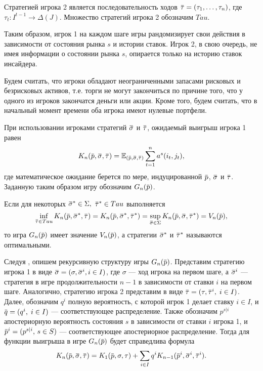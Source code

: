 {\begin{definition}
  Стратегией игрока 2 является последовательность ходов $\tauv = (\tau_1,
  \ldots, \tau_n)$, где $\tau_t: I^{t-1} \rightarrow \Delta(J)$. Множество
  стратегий игрока 2 обозначим $Tau$.
\end{definition}

Таким образом, игрок 1 на каждом шаге игры рандомизирует свои действия в
зависимости от состояния рынка $s$ и истории ставок. Игрок 2, в свою очередь, не
имея информации о состоянии рынка $s$, опирается только на историю ставок
инсайдера.

Будем считать, что игроки обладают неограниченными запасами рисковых и
безрисковых активов, т.е. торги не могут закончиться по причине того, что у
одного из игроков закончатся деньги или акции. Кроме того, будем считать, что в
начальный момент времени оба игрока имеют нулевые портфели.

При использовании игроками стратегий $\sigmav$ и $\tauv$, ожидаемый выигрыш
игрока 1 равен
\begin{equation*}
  \K(\p, \sigmav, \tauv) =
  \E_{(\p, \sigmav, \tauv)} \sum_{t=1}^n a^s(i_t, j_t),
\end{equation*}
где математическое ожидание берется по мере, индуцированной $\p$, $\sigmav$ и
$\tauv$. Заданную таким образом игру обозначим $\theGame(\p)$.

\begin{definition}
  Если для некоторых $\sigmav^* \in \Sigma,$ $\tauv^* \in Tau$
  выполняется
  \begin{equation*}
    \inf_{\tauv \in Tau} \K(\p, \sigmav^*, \tauv) =
    \K(\p, \sigmav^*, \tauv^*) =
    \sup_{\sigmav \in \Sigma} \K(\p, \sigmav, \tauv^*) = 
    \V(\p),
  \end{equation*}
  то игра $\theGame(\p)$ имеет значение $\V(\p)$, а стратегии $\sigmav^*$ и $\tauv^*$
  называются оптимальными.
\end{definition}

Следуя \cite{domansky11}, опишем рекурсивную структуру игры $\theGame(\p)$.
Представим стратегию игрока 1 в виде $\sigmav = (\sigma, \sigmav^i, i \in I)$,
где $\sigma$ --- ход игрока на первом шаге, а $\sigmav^i$ --- стратегия в игре
продолжительности $n-1$ в зависимости от ставки $i$ на первом шаге. Аналогично,
стратегию игрока 2 представим в виде $\tauv = (\tau, \tauv^i, \; i \in I)$.
%
Далее, обозначим $q^i$ полную вероятность, с которой игрок 1 делает ставку $i
\in I$, и $\q = (q^i, \; i \in I)$ --- соответствующее распределение. Также
обозначим $p^{s|i}$ апостериорную вероятность состояния $s$ в зависимости от
ставки $i$ игрока 1, и $\p^i = (p^{s|i}, \, s \in S)$ --- соответствующее
апостериорное распределение. Тогда для функции выигрыша в игре $\theGame[n](\p)$ будет
справедлива формула
\begin{equation}
  \label{problem:eq:Kn-recurrence}
  \K[n](\p, \sigmav, \tauv) =
  \K[1](\p, \sigma, \tau) +
  \sum_{i \in I} q^i \K[n-1](\p^i, \sigmav^i, \tauv^i).
\end{equation}

}

